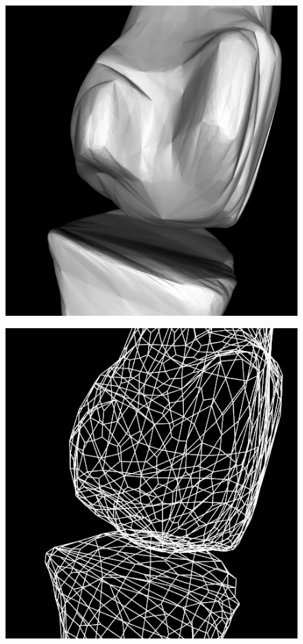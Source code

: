 \documentclass[10pt, conference, compsocconf]{IEEEtran}
\begin{document}
\begin{figure}[htbp]
{\begin{minipage}[h]{0.16\linewidth}
        \includegraphics[width=\textwidth]{./Figure/footbones/fingerBones/catmull3.png}\vspace{1ex}\\
      \end{minipage}%
      \begin{minipage}[h]{0.16\linewidth}
        \centering
        \includegraphics[width=\textwidth]{./Figure/footbones/fingerBones/catmull1-.png}\\

\end{minipage}}
\end{figure}
\end{document}
